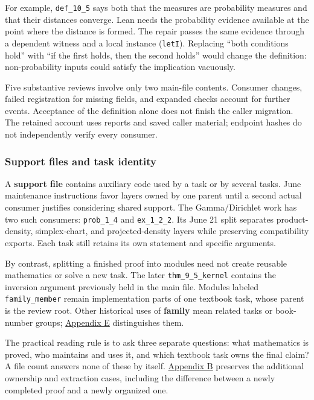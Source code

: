 For example, \nolinkurl{def_10_5} says both that the measures are probability measures and that their distances converge. Lean needs the probability evidence available at the point where the distance is formed. The repair passes the same evidence through a dependent witness and a local instance (\nolinkurl{letI}). Replacing “both conditions hold” with “if the first holds, then the second holds” would change the definition: non-probability inputs could satisfy the implication vacuously.

Five substantive reviews involve only two main-file contents. Consumer changes, failed registration for missing fields, and expanded checks account for further events. Acceptance of the definition alone does not finish the caller migration. The retained account uses reports and saved caller material; endpoint hashes do not independently verify every consumer.

\subsubsection[Support files and task identity]{\texorpdfstring{\protect\hypertarget{l2-5}{}Support files and task identity}{Support files and task identity}}
A \textbf{support file} contains auxiliary code used by a task or by several tasks. June maintenance instructions favor layers owned by one parent until a second actual consumer justifies considering shared support. The Gamma/Dirichlet work has two such consumers: \nolinkurl{prob_1_4} and \nolinkurl{ex_1_2_2}. Its June 21 split separates product-density, simplex-chart, and projected-density layers while preserving compatibility exports. Each task still retains its own statement and specific arguments.

By contrast, splitting a finished proof into modules need not create reusable mathematics or solve a new task. The later \nolinkurl{thm_9_5_kernel} contains the inversion argument previously held in the main file. Modules labeled \nolinkurl{family_member} remain implementation parts of one textbook task, whose parent is the review root. Other historical uses of \textbf{family} mean related tasks or book-number groups; \hyperlink{appendix-e}{Appendix E} distinguishes them.

The practical reading rule is to ask three separate questions: what mathematics is proved, who maintains and uses it, and which textbook task owns the final claim? A file count answers none of these by itself. \hyperlink{appendix-b}{Appendix B} preserves the additional ownership and extraction cases, including the difference between a newly completed proof and a newly organized one.

